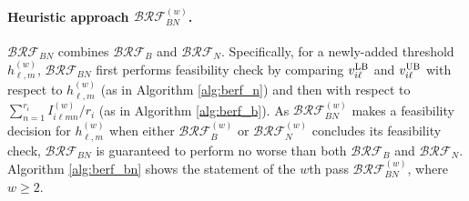 \documentclass[11pt]{article}
\begin{document}
\paragraph{Heuristic approach $\mathcal{BRF}_{BN}^{(w)}$.}
$\mathcal{BRF}_{BN}$ combines $\mathcal{BRF}_B$ and $\mathcal{BRF}_N$. Specifically, for a newly-added threshold $h_{\ell, m}^{(w)}$, $\mathcal{BRF}_{BN}$ first 
performs feasibility check by 
comparing $v_{i\ell}^{\rm LB}$ and $v_{i\ell}^{\rm U
B}$ with respect to $h_{\ell,m}^{(w)}$ (as in Algorithm \ref{alg:berf_n}) and then
with respect to $\sum_{n=1}^{r_i} I_{i\ell m n}^{(w)}/r_i$ (as in Algorithm \ref{alg:berf_b}).
As $\mathcal{BRF}_{BN}^{(w)}$ makes a feasibility decision for $h_{\ell, m}^{(w)}$ when either $\mathcal{BRF}_B^{(w)}$ or $\mathcal{BRF}_N^{(w)}$ concludes its feasibility check, $\mathcal{BRF}_{BN}$ is guaranteed to perform no worse than both $\mathcal{BRF}_{B}$ and $\mathcal{BRF}_{N}$.  
Algorithm \ref{alg:berf_bn} shows the statement of the $w$th pass $\mathcal{BRF}_{BN}^{(w)}$, where $w\geq 2$. 
\end{document}
